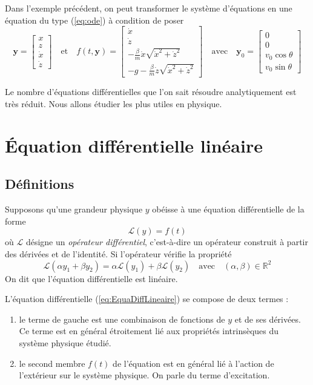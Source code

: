  Dans l'exemple précédent, on peut transformer le système d'équations en une équation du type (\ref{eq:ode}) à condition de poser 
\[
\mathbf{y}=
\begin{bmatrix}x \\ z \\ \dot x \\ \dot z \end{bmatrix}
\quad \text{et} \quad
f(t,\mathbf{y})=\begin{bmatrix}
\dot x \\
\dot z \\
-\frac{\beta}{m} \dot x  \sqrt{{\dot x}^{2}+{\dot z}^{2}} \\
-g-\frac{\beta}{m} \dot z  \sqrt{{\dot x}^{2}+{\dot z}^{2}}
\end{bmatrix}
\quad \text{avec} \quad
\mathbf{y}_{0}=
\begin{bmatrix}0 \\ 0 \\ v_{0}\cos\theta \\ v_{0}\sin\theta \end{bmatrix}
\]

Le nombre d’\'equations diff\'erentielles que l’on sait r\'esoudre analytiquement est tr\`es r\'eduit. Nous allons étudier les plus utiles en physique.




\section[EDO linéaire]{Équation différentielle linéaire}\label{subsec:EL}

\subsection{Définitions}

Supposons qu'une grandeur physique $y$  obéisse à une équation différentielle de la forme  
\begin{equation}
	\mathcal{L}(y)=f(t)
	\label{eq:EquaDiffLineaire}
\end{equation}
où  $\mathcal{L}$ désigne un \emph{opérateur différentiel}, c'est-à-dire un opérateur construit à partir des dérivées et de l'identité. Si l'opérateur vérifie la propriété 
\[
\mathcal{L}(\alpha y_{1}+\beta y_{2})=\alpha \mathcal{L}(y_{1})+\beta \mathcal{L}(y_{2})\quad \text{avec}\quad (\alpha,\beta)\in\mathbb{R}^{2}
\]
On dit que l'équation différentielle est linéaire.

L'équation différentielle (\ref{eq:EquaDiffLineaire}) se compose de deux termes :
\begin{enumerate}
	\item  le terme de gauche est une combinaison de fonctions de $y$ et de ses dérivées. Ce terme est en général étroitement lié aux propriétés intrinsèques du système physique étudié. 
	\item le second membre $f(t)$ de l'équation est en général lié à l'action de l'extérieur sur le système physique. On parle du terme d'excitation. 
\end{enumerate}

